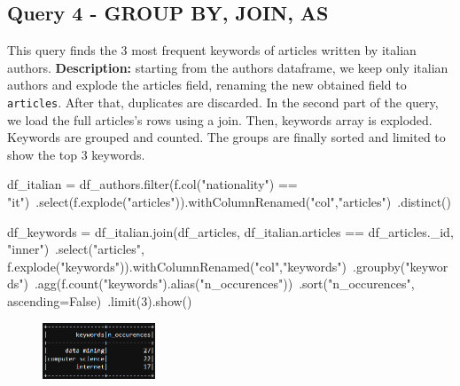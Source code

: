 \documentclass{Configuration_Files/PoliMi3i_thesis}
\begin{document}
\subsection{Query 4 - GROUP BY, JOIN, AS}
This query finds the 3 most frequent keywords of articles written by italian authors.\newline
\textbf{Description:} starting from the authors dataframe, we keep only italian authors and explode the articles field, renaming the
new obtained field to \verb |articles|. After that, duplicates are discarded.\newline
In the second part of the query, we load the full articles's rows using a join. Then, keywords array is exploded. Keywords are grouped
and counted. The groups are finally sorted and limited to show the top 3 keywords.\newline
\begin{python}
df_italian = df_authors.filter(f.col("nationality") == "it")\
                       .select(f.explode("articles")).withColumnRenamed("col","articles")\
                       .distinct()

df_keywords = df_italian.join(df_articles, df_italian.articles == df_articles._id, "inner")\
                        .select("articles", f.explode("keywords")).withColumnRenamed("col","keywords")\
                        .groupby("keywords")\
                        .agg(f.count("keywords").alias("n_occurences"))\
                        .sort("n_occurences", ascending=False)\
                        .limit(3).show()
\end{python}
\begin{figure}[H]
\centering
\includegraphics[width=0.3\textwidth]{query/spark_q4.PNG}
\label{fig:query4}
\end{figure}
\end{document}
